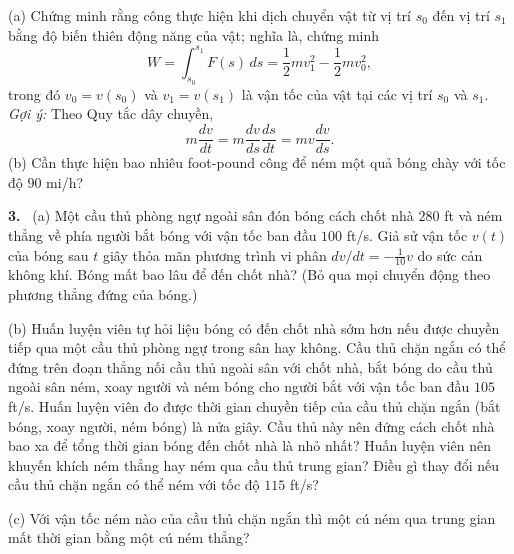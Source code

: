 \documentclass[12pt,a4paper]{article}
\newcommand{\bt}[1]{\par\smallskip\Needspace{5\baselineskip}\noindent\textbf{#1.}\ }
\newcommand{\prj}[1]{\bt{#1}}
\begin{document}
(a) Chứng minh rằng công thực hiện khi dịch chuyển vật từ vị trí $s_0$ đến vị trí $s_1$ bằng độ biến thiên động năng của vật; nghĩa là, chứng minh
\[W=\int_{s_0}^{s_1}F(s)\,ds=\frac12mv_1^2-\frac12mv_0^2,\]
trong đó $v_0=v(s_0)$ và $v_1=v(s_1)$ là vận tốc của vật tại các vị trí $s_0$ và $s_1$. \textit{Gợi ý:} Theo Quy tắc dây chuyền,
\[m\frac{dv}{dt}=m\frac{dv}{ds}\frac{ds}{dt}=mv\frac{dv}{ds}.\]
(b) Cần thực hiện bao nhiêu foot-pound công để ném một quả bóng chày với tốc độ $90$ mi/h?
\prj{3} (a) Một cầu thủ phòng ngự ngoài sân đón bóng cách chốt nhà $280$ ft và ném thẳng về phía người bắt bóng với vận tốc ban đầu $100$ ft/s. Giả sử vận tốc $v(t)$ của bóng sau $t$ giây thỏa mãn phương trình vi phân $dv/dt=-\frac1{10}v$ do sức cản không khí. Bóng mất bao lâu để đến chốt nhà? (Bỏ qua mọi chuyển động theo phương thẳng đứng của bóng.)

(b) Huấn luyện viên tự hỏi liệu bóng có đến chốt nhà sớm hơn nếu được chuyền tiếp qua một cầu thủ phòng ngự trong sân hay không. Cầu thủ chặn ngắn có thể đứng trên đoạn thẳng nối cầu thủ ngoài sân với chốt nhà, bắt bóng do cầu thủ ngoài sân ném, xoay người và ném bóng cho người bắt với vận tốc ban đầu $105$ ft/s. Huấn luyện viên đo được thời gian chuyền tiếp của cầu thủ chặn ngắn (bắt bóng, xoay người, ném bóng) là nửa giây. Cầu thủ này nên đứng cách chốt nhà bao xa để tổng thời gian bóng đến chốt nhà là nhỏ nhất? Huấn luyện viên nên khuyến khích ném thẳng hay ném qua cầu thủ trung gian? Điều gì thay đổi nếu cầu thủ chặn ngắn có thể ném với tốc độ $115$ ft/s?

(c) Với vận tốc ném nào của cầu thủ chặn ngắn thì một cú ném qua trung gian mất thời gian bằng một cú ném thẳng?
\end{document}
